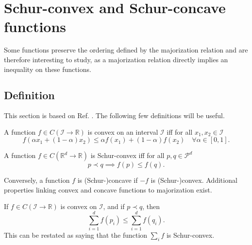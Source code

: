 \section{Schur-convex and Schur-concave functions}

 Some functions preserve the ordering defined by the majorization relation and are therefore interesting to study, as a majorization relation directly implies an inequality on these functions.

\subsection{Definition}

This section is based on Ref. \cite[pp. 79--92]{marshall_inequalities_2011}. The following few definitions will be useful.

\begin{definition}
    A function $f \in C(\mathcal{I} \to \mathbb{R})$ is convex on an interval $\mathcal{I}$ iff for all $x_1, x_2 \in \mathcal{I}$
    \begin{equation}
        f(\alpha x_1 + (1-\alpha) x_2) \leq \alpha f(x_1) + (1-\alpha) f(x_2) \quad \forall \alpha \in [0, 1].
    \end{equation}
\end{definition}

\begin{definition}
    A function $f \in C(\mathbb{R}^d \to \mathbb{R})$ is Schur-convex iff for all $p, q \in \mathcal{P}^d$
    \begin{equation}
        p \prec q \implies f(p) \leq f(q).
    \end{equation}
\end{definition}

Conversely, a function $f$ is (Schur-)concave if $-f$ is (Schur-)convex. Additional properties linking convex and concave functions to majorization exist.

\begin{lemma} \label{lem:karamata}
    If $f \in C(\mathcal{I} \to \mathbb{R})$ is convex on $\mathcal{I}$, and if $p \prec q$, then
    \begin{equation}
        \sum_{i=1}^{d} f(p_i) \leq \sum_{i=1}^{d} f(q_i).
    \end{equation}
    This can be restated as saying that the function $\sum_i f$ is Schur-convex.
\end{lemma}

